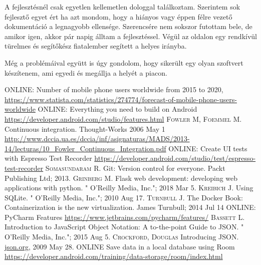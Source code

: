 \documentclass{thesis-ekf}
\theoremstyle{definition}
\theoremstyle{remark}
\begin{document}
A fejlesztésnél csak egyetlen kellemetlen dologgal találkoztam. Szerintem sok fejlesztő egyet ért ha azt mondom, hogy a hiányos vagy éppen félre vezető dokumentáció a legnagyobb ellensége.
Szerencsére nem sokszor futottam bele, de amikor igen, akkor pár napig álltam a fejlesztéssel. Végül az oldalon egy rendkívül türelmes és segítőkész fiatalember segített a helyes irányba. 

Még a problémáival együtt is úgy gondolom, hogy sikerült egy olyan szoftvert készítenem, ami egyedi és megállja a helyét a piacon. 

\begin{thebibliography}{1}
 \textsc{ONLINE}: Number of mobile phone users worldwide from 2015 to 2020, \url{https://www.statista.com/statistics/274774/forecast-of-mobile-phone-users-worldwide}
 \textsc{ONLINE}: Everything you need to build on Android \url{https://developer.android.com/studio/features.html}
 \textsc{Fowler M, Foemmel M.} Continuous integration. Thought-Works 2006 May 1 \url{http://www.dccia.ua.es/dccia/inf/asignaturas/MADS/2013-14/lecturas/10_Fowler_Continuous_Integration.pdf}
 \textsc{ONLINE}: Create UI tests with Espresso Test Recorder \url{https://developer.android.com/studio/test/espresso-test-recorder}
 \textsc{Somasundaram R.} Git: Version control for everyone. Packt Publishing Ltd; 2013.
 \textsc{Grinberg M.} Flask web development: developing web applications with python. " O'Reilly Media, Inc."; 2018 Mar 5.
 \textsc{Kreibich J.} Using SQLite. " O'Reilly Media, Inc."; 2010 Aug 17.
 \textsc{Turnbull J.} The Docker Book: Containerization is the new virtualization. James Turnbull; 2014 Jul 14
 \textsc{ONLINE}: PyCharm Features \url{https://www.jetbrains.com/pycharm/features/}
 \textsc{Bassett L.} Introduction to JavaScript Object Notation: A to-the-point Guide to JSON. " O'Reilly Media, Inc."; 2015 Aug 5.
 \textsc{Crockford, Douglas} Introducing JSON. \url{json.org}, 2009 May 28.
 \textsc{ONLINE} Save data in a local database using Room \url{https://developer.android.com/training/data-storage/room/index.html}
\end{thebibliography}
\end{document}

